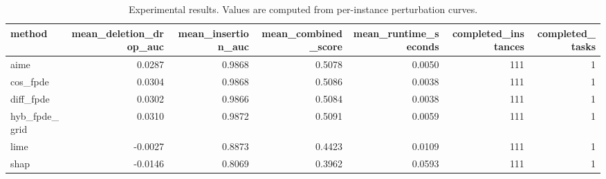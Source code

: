 \begin{table}[t]
\caption{Experimental results. Values are computed from per-instance perturbation curves.}
\label{tab:main_results_computed}
\centering
\begin{tabular}{lrrrrrr}
\toprule
method & mean\_deletion\_drop\_auc & mean\_insertion\_auc & mean\_combined\_score & mean\_runtime\_seconds & completed\_instances & completed\_tasks \\
\midrule
aime & 0.0287 & 0.9868 & 0.5078 & 0.0050 & 111 & 1 \\
cos\_fpde & 0.0304 & 0.9868 & 0.5086 & 0.0038 & 111 & 1 \\
diff\_fpde & 0.0302 & 0.9866 & 0.5084 & 0.0038 & 111 & 1 \\
hyb\_fpde\_grid & 0.0310 & 0.9872 & 0.5091 & 0.0059 & 111 & 1 \\
lime & -0.0027 & 0.8873 & 0.4423 & 0.0109 & 111 & 1 \\
shap & -0.0146 & 0.8069 & 0.3962 & 0.0593 & 111 & 1 \\
\bottomrule
\end{tabular}

\end{table}
